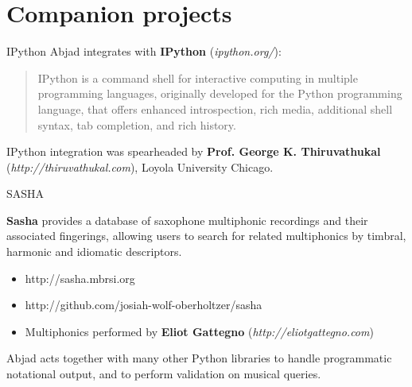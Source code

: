 \section{Companion projects}

\begin{frame}{IPython}
Abjad integrates with \textbf{IPython} (\emph{ipython.org/}):

\begin{quote}
IPython is a command shell for interactive computing in multiple programming
languages, originally developed for the Python programming language, that
offers enhanced introspection, rich media, additional shell syntax, tab
completion, and rich history.
\end{quote}

IPython integration was spearheaded by \textbf{Prof. George K. Thiruvathukal}
(\emph{http://thiruvathukal.com}), Loyola University Chicago.
\end{frame}

\begin{frame}{SASHA}

\textbf{Sasha} provides a database of saxophone multiphonic recordings and
their associated fingerings, allowing users to search for related multiphonics
by timbral, harmonic and idiomatic descriptors.

\begin{itemize}
    \item http://sasha.mbrsi.org
    \item http://github.com/josiah-wolf-oberholtzer/sasha
    \item Multiphonics performed by \textbf{Eliot Gattegno}
        (\emph{http://eliotgattegno.com})
\end{itemize}

Abjad acts together with many other Python libraries to handle programmatic
notational output, and to perform validation on musical queries.

\end{frame}